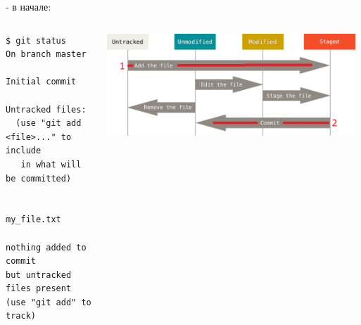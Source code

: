 \documentclass[presentation]{beamer}
\begin{document}
\begin{frame}[fragile,label={sec:orga9e8f79}]{- в начале:}
 \begin{columns}
\begin{column}{0.65\columnwidth}
\begin{verbatim}
$ git status
On branch master

Initial commit

Untracked files:
  (use "git add <file>..." to include 
   in what will be committed)

        my_file.txt

nothing added to commit 
but untracked files present 
(use "git add" to track)
\end{verbatim}
\end{column}

\begin{column}{0.35\columnwidth}
\begin{center}
\includegraphics[width=0.98\textwidth]{./01_vcs_01_git_file_states_01_add.png}
\end{center}
\end{column}
\end{columns}
\end{frame}
\end{document}
